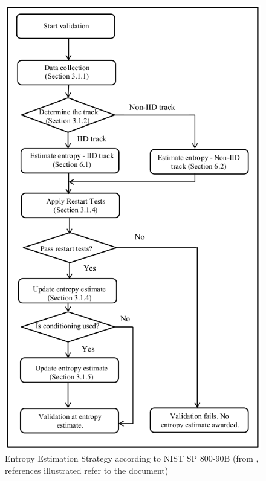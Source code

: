 \begin{figure}[H]
	\label{fig:entropy-est-strategy}
	\centering
	\includegraphics[scale=0.6]{img/nsp800-90b-entropy-est-strategy.png}
	\caption{Entropy Estimation Strategy according to NIST SP 800-90B (from \cite{turan2018nist}, references illustrated refer to the document)}
\end{figure}





